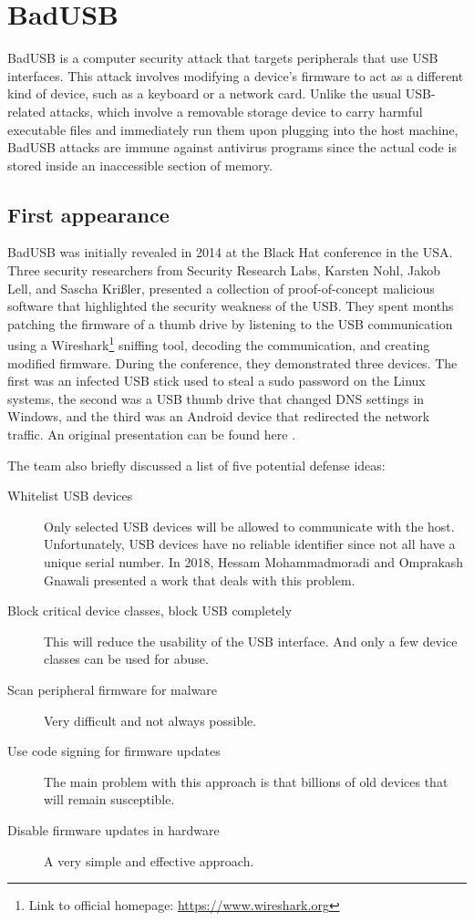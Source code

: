 
\chapter{BadUSB}
\label{ch:badusb}
BadUSB is a computer security attack that targets peripherals that use USB interfaces. This attack involves modifying a device's firmware to act as a different kind of device, such as a keyboard or a network card. Unlike the usual USB-related attacks, which involve a removable storage device to carry harmful executable files and immediately run them upon plugging into the host machine, BadUSB attacks are immune against antivirus programs since the actual code is stored inside an inaccessible section of memory.

\section{First appearance}
\label{sec:badusb_first_appearance}
BadUSB was initially revealed in 2014 at the Black Hat conference in the USA. Three security researchers from Security Research Labs, Karsten Nohl, Jakob Lell, and Sascha Krißler, presented a collection of proof-of-concept malicious software that highlighted the security weakness of the USB\cite{BlackHat}. They spent months patching the firmware of a thumb drive by listening to the USB communication using a Wireshark\footnote{Link to official homepage: \url{https://www.wireshark.org}} sniffing tool, decoding the communication, and creating modified firmware. During the conference, they demonstrated three devices. The first was an infected USB stick used to steal a sudo password on the Linux systems, the second was a USB thumb drive that changed DNS settings in Windows, and the third was an Android device that redirected the network traffic. An original presentation can be found here \cite{srl_badusb}.

The team also briefly discussed a list of five potential defense ideas:
\begin{description}
    \item [Whitelist USB devices] Only selected USB devices will be allowed to communicate with the host. Unfortunately, USB devices have no reliable identifier since not all have a unique serial number. In 2018, Hessam Mohammadmoradi and Omprakash Gnawali presented a work that deals with this problem\cite{whitelistBadUSB2018}.
    \item [Block critical device classes, block USB completely] This will reduce the usability of the USB interface. And only a few device classes can be used for abuse.
    \item [Scan peripheral firmware for malware] Very difficult and not always possible.
    \item [Use code signing for firmware updates] The main problem with this approach is that billions of old devices that will remain susceptible.
    \item [Disable firmware updates in hardware] A very simple and effective approach.
\end{description}

